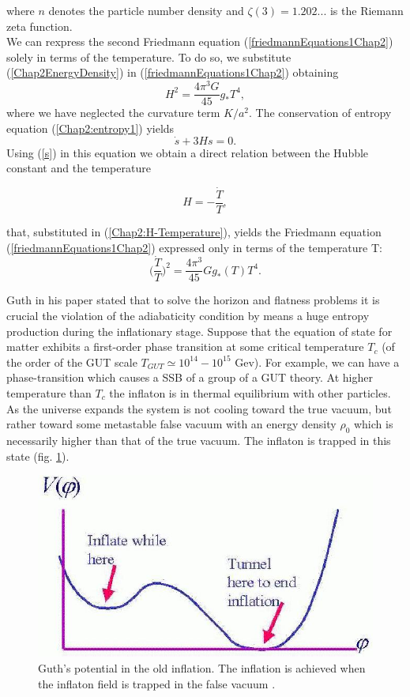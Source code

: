 \documentclass[11pt,a4paper,twoside]{book}
\begin{document}
where $ n $ denotes the particle number density and $\zeta(3)=1.202...$ is the Riemann zeta function.\\
We can rexpress the second Friedmann equation (\ref{friedmannEquations1Chap2}) solely in terms of the temperature. To do so, we substitute (\ref{Chap2EnergyDensity}) in (\ref{friedmannEquations1Chap2})  obtaining
\begin{equation}
	\label{Chap2:H-Temperature}
	H^{2}=\frac{4\pi^{3}G}{45}g_{*}T^{4},
\end{equation}
where we have neglected  the curvature term $ K/a^{2} $.
The conservation of entropy equation (\ref{Chap2:entropy1}) yields
\begin{equation}
	\label{Chap2entropy2}
	\dot{s} + 3Hs=0.
\end{equation}
Using  (\ref{s}) in this equation we obtain a direct relation between the Hubble constant and the temperature 

\begin{equation}
	\label{Chap2:relationTemperatureEntropy}
	H=-\frac{\dot{T}}{T},
\end{equation}

that, substituted in (\ref{Chap2:H-Temperature}), yields the Friedmann equation (\ref{friedmannEquations1Chap2}) expressed only in terms of the temperature T: 
\begin{equation}
	\label{Chap2:Friedmann-Temperature}
	\Big(\frac{\dot{T}}{T}\Big)^{2}=\frac{4\pi^{3}}{45}Gg_{*}(T)T^{4}.
\end{equation}

Guth in his paper stated that to solve the horizon and flatness problems it is crucial the violation of the adiabaticity condition by means a huge entropy production during the inflationary stage.
Suppose that the equation of state for matter exhibits a first-order phase transition at some critical temperature $ T_{c} $ (of the order of the GUT scale $T_{GUT}\simeq 10^{14}-10^{15}$ Gev). For example, we can have a phase-transition which causes a SSB of a group of a GUT theory. At higher temperature than $ T_{c} $ the inflaton is in thermal equilibrium with other particles.
As the universe expands the system is not cooling toward the true vacuum, but rather toward some metastable false vacuum with an energy density $ \rho_{0} $ which is necessarily higher than that of the true vacuum. The inflaton is trapped in this state (fig. \ref{fig:guthinflationfig5}).

\begin{figure}
	\centering
	\includegraphics[width=0.5\linewidth, height=0.24\textheight]{Images/Chap2/GuthInflation_Fig5}
	\caption{Guth's potential in the old inflation. The inflation is achieved when the inflaton field is trapped in the false vacuum \cite{Chap2:Fig1}. }
	\label{fig:guthinflationfig5}
\end{figure}
\end{document}
